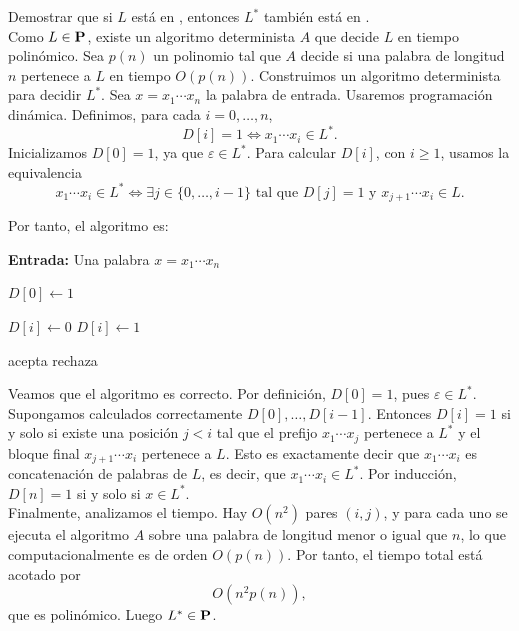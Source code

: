 


\begin{ejercicio}
    Demostrar que si $L$ está en \Pol, entonces $L^*$ también está en \Pol. \\

    Como $L \in \textbf{P}$, existe un algoritmo determinista $A$ que decide $L$ en tiempo
    polinómico. Sea $p(n)$ un polinomio tal que $A$ decide si una palabra de longitud
    $n$ pertenece a $L$ en tiempo $O(p(n))$. Construimos un algoritmo 
    determinista para decidir $L^*$. Sea $x = x_1 \cdots x_n$
    la palabra de entrada. Usaremos programación dinámica. Definimos, para cada
    $i = 0,\dots,n$,
    $$D[i] = 1 \iff x_1 \cdots x_i \in L^*.$$
    Inicializamos $D[0] = 1$, ya que $\varepsilon \in L^*$. Para calcular 
    $D[i]$, con $i \geq 1$, usamos la equivalencia
    $$x_1 \cdots x_i \in L^*
    \iff \exists j \in \{0,\dots,i-1\} \text{ tal que } D[j] = 1
    \text{ y } x_{j+1} \cdots x_i \in L.$$

    Por tanto, el algoritmo es:

    \begin{algorithm}
        \caption{Decisor para $L^*$}
        \begin{algorithmic}
            \State \textbf{Entrada:} Una palabra $x = x_1 \cdots x_n$

            \State $D[0] \gets 1$

                \State $D[i] \gets 0$
                        \State $D[i] \gets 1$
                    \EndIf
                \EndFor
            \EndFor

                \State acepta
            \Else
                \State rechaza
            \EndIf
        \end{algorithmic}
    \end{algorithm}

    Veamos que el algoritmo es correcto. Por definición, $D[0] = 1$, pues
    $\varepsilon \in L^*$. Supongamos calculados correctamente $D[0],\dots,D[i-1]$.
    Entonces $D[i] = 1$ si y solo si existe una posición $j < i$ tal que el prefijo
    $x_1 \cdots x_j$ pertenece a $L^*$ y el bloque final $x_{j+1}\cdots x_i$ pertenece
    a $L$. Esto es exactamente decir que $x_1 \cdots x_i$ es concatenación de palabras
    de $L$, es decir, que $x_1 \cdots x_i \in L^*$. Por inducción, $D[n] = 1$ si y
    solo si $x \in L^*$. \\

    Finalmente, analizamos el tiempo. Hay $O(n^2)$ pares $(i,j)$, y para cada uno se
    ejecuta el algoritmo $A$ sobre una palabra de longitud menor o igual que $n$, lo que
    computacionalmente es de orden $O(p(n))$. Por tanto, el tiempo total está acotado por
    $$O(n^2p(n)),$$ que es polinómico. Luego $L^* \in \textbf{P}$.
\end{ejercicio}



